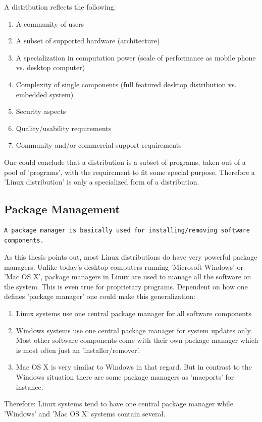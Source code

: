 \documentclass[a4paper,10pt]{article}
\begin{document}
A distribution reflects the following:
\begin{enumerate}
 \item A community of users
 \item A subset of supported hardware (architecture)
 \item A specialization in computation power (scale of performance as mobile phone vs. desktop computer)
 \item Complexity of single components (full featured desktop distribution vs. embedded system)
 \item Security aspects
 \item Quality/usability requirements
 \item Community and/or commercial support requirements
\end{enumerate}
One could conclude that a distribution is a subset of programs, taken out of a pool of 'programs', with the requirement to fit some special purpose. Therefore a 'Linux distribution' is only a specialized form of a distribution.












\subsection{Package Management}
\begin{verbatim}
A package manager is basically used for installing/removing software components.	
\end{verbatim}
As this thesis points out, most Linux distributions do have very powerful package managers. Unlike today's desktop computers running 'Microsoft Windows' or 'Mac OS X',  package managers in Linux are used to manage all the software on the system. This is even true for proprietary programs. Dependent on how one defines 'package manager' one could make this generalization:
\begin{enumerate}
 \item Linux systems use one central package manager for all software components
 \item Windows systems use one central package manager for system updates only. Most other software components come with their own package manager which is most often just an 'installer/remover'. 
 \item Mac OS X is very similar to Windows in that regard. But in contrast to the Windows situation there are some package managers as 'macports' for instance.
\end{enumerate}
Therefore: Linux systems tend to have one central package manager while 'Windows' and 'Mac OS X' systems contain several.\\
\end{document}
